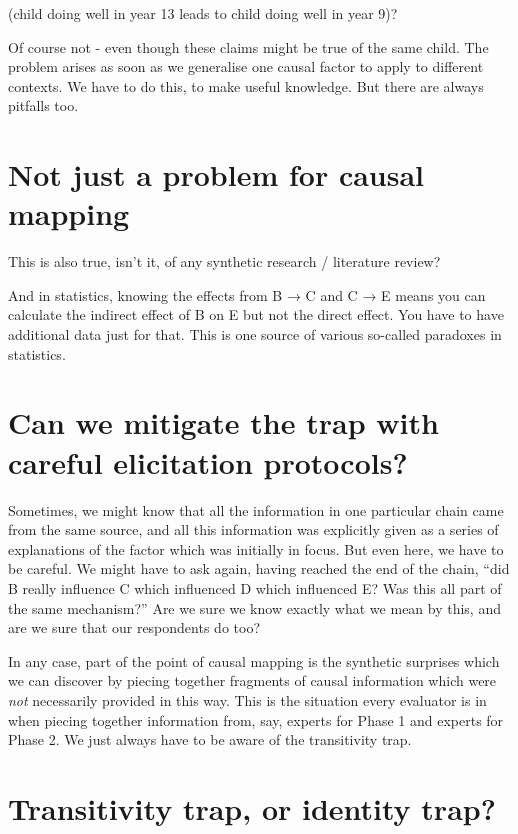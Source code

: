 \documentclass[
]{book}
\begin{document}
(child doing well in year 13 leads to child doing well in year 9)?

Of course not - even though these claims might be true of the same child. The problem arises as soon as we generalise one causal factor to apply to different contexts. We have to do this, to make useful knowledge. But there are always pitfalls too.

\hypertarget{not-just-a-problem-for-causal-mapping}{%
\section{Not just a problem for causal mapping}\label{not-just-a-problem-for-causal-mapping}}

This is also true, isn't it, of any synthetic research / literature review?

And in statistics, knowing the effects from B → C and C → E means you can calculate the indirect effect of B on E but not the direct effect. You have to have additional data just for that. This is one source of various so-called paradoxes in statistics.

\hypertarget{can-we-mitigate-the-trap-with-careful-elicitation-protocols}{%
\section{Can we mitigate the trap with careful elicitation protocols?}\label{can-we-mitigate-the-trap-with-careful-elicitation-protocols}}

Sometimes, we might know that all the information in one particular chain came from the same source, and all this information was explicitly given as a series of explanations of the factor which was initially in focus. But even here, we have to be careful. We might have to ask again, having reached the end of the chain, ``did B really influence C which influenced D which influenced E? Was this all part of the same mechanism?'' Are we sure we know exactly what we mean by this, and are we sure that our respondents do too?

In any case, part of the point of causal mapping is the synthetic surprises which we can discover by piecing together fragments of causal information which were \emph{not} necessarily provided in this way. This is the situation every evaluator is in when piecing together information from, say, experts for Phase 1 and experts for Phase 2. We just always have to be aware of the transitivity trap.

\hypertarget{transitivity-trap-or-identity-trap}{%
\section{Transitivity trap, or identity trap?}\label{transitivity-trap-or-identity-trap}}
\end{document}
